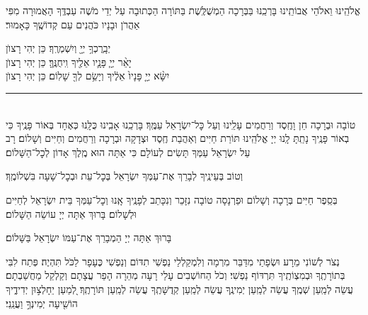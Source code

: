 \documentclass[twoside, openany, parskip=half, 11pt]{book}
\begin{document}
\retzeh

\yaalehveyavo

\zion

\modim

\alhanisim

\weekdaysahodos

אֱלֹהֵֽינוּ וֵאלֹהֵי אֲבוֹתֵֽינוּ בָּרְכֵֽנוּ בַּבְּרָכָה הַמְשֻׁלֶּֽשֶׁת בַּתּוֹרָה
הַכְּתוּבָה עַל יְדֵי מֹשֶׁה עַבְדֶּֽךָ הָאֲמוּרָה מִפִּי אַהֲרֹן וּבָנָיו כֹּהֲנִים עַם קְדוֹשֶֽׁךָ כָּאָמוּר׃

יְבָֽרֶכְךָ֥ יְיָ֖ וְיִשְׁמְרֶֽךָ׃ \hfill \kahal כֵּן יְהִי רָצוׂן \\
יָאֵ֨ר יְיָ֧ פָּנָ֛יו אֵלֶ֖יךָ וִֽיחֻנֶּֽךָּ׃ \hfill \kahal כֵּן יְהִי רָצוׂן \\
יִשָּׂ֨א יְיָ֤ פָּנָיו֙ אֵלֶ֔יךָ וְיָשֵׂ֥ם לְךָ֖ שָׁלֽוֹם׃ \hfill \kahal כֵּן יְהִי רָצוׂן

\rule[-0.5ex]{3in}{1pt}

\begin{paracol}{2}
\\
טוֹבָה וּבְרָכָה חֵן וָחֶֽסֶד וְרַחֲמִים עָלֵֽינוּ וְעַל כׇּל־יִשְׂרָאֵל עַמֶּֽךָ׃ בָּרְכֵֽנוּ אָבִֽינוּ כֻּלָּֽנוּ כְּאֶחָד בְּאוֹר פָּנֶֽיךָ כִּי בְאוֹר פָּנֶֽיךָ נָתַֽתָּ לָֽנוּ יְיָ אֱלֹהֵֽינוּ תּוֹרַת חַיִּים וְאַהֲבַת חֶֽסֶד וּצְדָקָה וּבְרָכָה וְרַחֲמִים וְחַיִּים וְשָׁלוֹם׃
\switchcolumn
{}
רָב עַל יִשְׂרָאֵל עַמְּךָ תָּשִׂים לְעוֹלָם כִּי אַתָּה הוּא מֶֽלֶךְ אָדוֹן לְכׇל־הַשָּׁלוֹם׃
\end{paracol}
וְטוֹב בְּעֵינֶֽיךָ לְבָרֵךְ אֶת־עַמְּךָ יִשְׂרָאֵל בְּכׇל־עֵת וּבְכׇל־שָׁעָה בִּשְׁלוֹמֶֽךָ׃


\begin{paracol}{2}
\begin{small}
בְּסֵֽפֶר חַיִּים בְּרָכָה וְשָׁלוֹם וּפַרְנָסָה טוֹבָה נִזָּכֵר וְנִכָּתֵב לְפָנֶֽיךָ אָֽנוּ וְכׇל־עַמְּךָ בֵּית יִשְׂרָאֵל לְחַיִּים וּלְשָׁלוֹם׃ בָּרוּךְ אַתָּה יְיָ עוֹשֵׂה הַשָּׁלוֹם׃

\end{small}
\switchcolumn
בָּרוּךְ אַתָּה יְיָ הַמְבָרֵךְ אֶת־עַמּוֹ יִשְׂרָאֵל בַּשָּׁלוֹם׃

\end{paracol}

נְצֹר לְשׁוֹנִי מֵרָע וּשְׂפָתַי מִדַּבֵּר מִרְמָה וְלִמְקַלְלַי נַפְשִׁי תִדּוֹם וְנַפְשִׁי כֶּעָפָר לַכֹּל תִּהְיֶה׃ פְּתַח לִבִּי בְּתוֹרָתֶֽךָ וּבְמִצְוֹתֶֽיךָ תִּרְדּוֹף נַפְשִׁי׃ וְכֹל הַחוֹשְׁבִים עָלַי רָעָה מְהֵרָה הָפֵר עֲצָתָם וְקַלְקֵל מַחֲשַׁבְתָם׃ עֲשֵׂה לְמַֽעַן שְׁמֶֽךָ עֲשֵׂה לְמַֽעַן יְמִינֶֽךָ עֲשֵׂה לְמַֽעַן קְדֻשָּׁתֶֽךָ עֲשֵׂה לְמַֽעַן תּוֹרָתֶֽךָ׃ לְ֭מַעַן יֵחָלְצ֣וּן יְדִידֶ֑יךָ
הוֹשִׁ֖יעָה יְמִינְךָ֣ וַעֲנֵֽנִי׃
\end{document}
